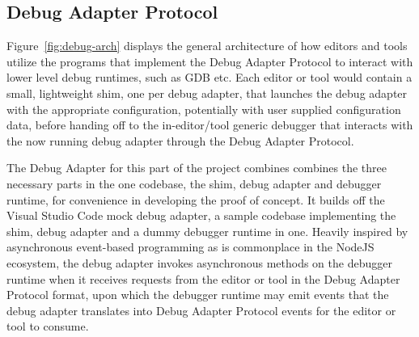 \documentclass[12pt,pdftex,titlepage]{report}
\begin{document}
            \subsection{Debug Adapter Protocol}
                Figure~\ref{fig:debug-arch} displays the general architecture of how editors and tools utilize the programs that implement the Debug Adapter Protocol to interact with
                lower level debug runtimes, such as GDB etc. Each editor or tool would contain a small, lightweight shim, one per debug adapter, that launches the debug adapter with the
                appropriate configuration, potentially with user supplied configuration data, before handing off to the in-editor/tool generic debugger that interacts with the now running
                debug adapter through the Debug Adapter Protocol.

                The Debug Adapter for this part of the project combines combines the three necessary parts in the one codebase, the shim, debug adapter and debugger runtime, for convenience
                in developing the proof of concept. It builds off the Visual Studio Code mock debug adapter\cite{mockdebug}, a sample codebase implementing the shim, debug adapter and a dummy debugger
                runtime in one. Heavily inspired by asynchronous event-based programming as is commonplace in the NodeJS ecosystem, the debug adapter invokes asynchronous methods on the 
                debugger runtime when it receives requests from the editor or tool in the Debug Adapter Protocol format, upon which the debugger runtime may emit events that the debug adapter
                translates into Debug Adapter Protocol events for the editor or tool to consume.
\end{document}
